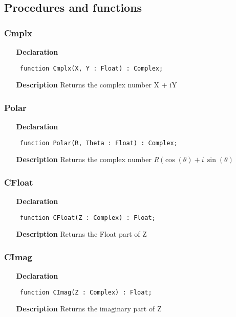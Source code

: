 \documentclass[12pt,a4paper,oneside]{report}
\newcommand{\declarationitem}[1]{\textbf{#1}}
\newcommand{\descriptiontitle}[1]{\textbf{#1}}
\newcommand{\code}[1]{\texttt{#1}}
\begin{document}
\subsection{Procedures and functions}
\subsubsection{Cmplx}
\label{ucomplex-Cmplx}
\begin{itemize}\item[\declarationitem{Declaration}\hfill]
\begin{flushleft}
\code{
function Cmplx(X, Y : Float) : Complex;}
\end{flushleft}
\item[\descriptiontitle{Description}]
Returns the complex number X + iY
\end{itemize}
\subsubsection{Polar}
\label{ucomplex-Polar}
\begin{itemize}\item[\declarationitem{Declaration}\hfill]
\begin{flushleft}
\code{
function Polar(R, Theta : Float) : Complex;}
\end{flushleft}
\item[\descriptiontitle{Description}]
Returns the complex number
$R\,(\cos(\theta)+i\,\sin(\theta)$
\end{itemize}
\subsubsection{CFloat}
\label{ucomplex-CFloat}
\begin{itemize}\item[\declarationitem{Declaration}\hfill]
\begin{flushleft}
\code{
function CFloat(Z : Complex) : Float;}

\end{flushleft}

\par
\item[\descriptiontitle{Description}]
Returns the Float part of Z

\end{itemize}
\subsubsection{CImag}
\label{ucomplex-CImag}
\begin{itemize}\item[\declarationitem{Declaration}\hfill]
\begin{flushleft}
\code{
function CImag(Z : Complex) : Float;}

\end{flushleft}

\par
\item[\descriptiontitle{Description}]
Returns the imaginary part of Z

\end{itemize}
\end{document}
